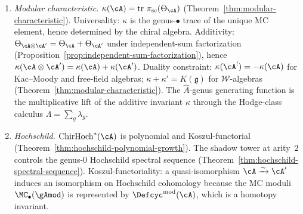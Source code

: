 \begin{theorem}
\begin{enumerate}[label=\textup{(\Alph*)}]
  forces the decomposition
  $\Defcyc(\cA) = L^+_\cA \oplus L^-_\cA$
  into complementary Lagrangians.
\item \emph{Modular characteristic.}
  $\kappa(\cA) = \operatorname{tr}\,\pi_{\mathrm{sc}}(\Theta_\cA)$
  \textup{(}Theorem~\textup{\ref{thm:modular-characteristic}}\textup{)}.
  Universality: $\kappa$ is the
  genus-$\bullet$ trace of the unique MC element, hence
  determined by the chiral algebra.
  Additivity: $\Theta_{\cA \otimes \cA'} =
  \Theta_\cA + \Theta_{\cA'}$ under independent-sum
  factorization
  \textup{(}Proposition~\textup{\ref{prop:independent-sum-factorization}}\textup{)},
  hence $\kappa(\cA \otimes \cA') =
  \kappa(\cA) + \kappa(\cA')$.
  Duality constraint: $\kappa(\cA^!) = -\kappa(\cA)$ for
  Kac--Moody and free-field algebras;
  $\kappa + \kappa' = K(\mathfrak{g})$ for
  $\mathcal{W}$-algebras (Theorem~\ref{thm:modular-characteristic}).
  The $\hat{A}$-genus generating function is the
  multiplicative lift of the additive invariant $\kappa$ through
  the Hodge-class calculus $\Lambda = \sum_g \lambda_g$.
\item \emph{Hochschild.}
  $\mathrm{ChirHoch}^*(\cA)$ is polynomial and
  Koszul-functorial
  \textup{(}Theorem~\textup{\ref{thm:hochschild-polynomial-growth}}\textup{)}.
  The shadow tower at arity~$2$
  controls the genus-$0$ Hochschild spectral sequence
  \textup{(}Theorem~\textup{\ref{thm:hochschild-spectral-sequence}}\textup{)}.
  Koszul-functoriality:
  a quasi-isomorphism $\cA \xrightarrow{\sim} \cA'$
  induces an isomorphism on Hochschild cohomology because
  the MC moduli $\MC_\bullet(\gAmod)$ is represented by
  $\Defcyc^{\mathrm{mod}}(\cA)$, which is a homotopy
  invariant.
\end{enumerate}
\end{theorem}

